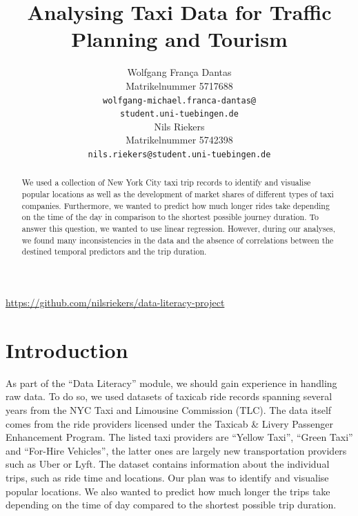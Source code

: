 \documentclass{article}
\title{Analysing Taxi Data for Traffic Planning and Tourism}
\author{%
  Wolfgang França Dantas\\
  Matrikelnummer 5717688\\
  \texttt{wolfgang-michael.franca-dantas@} \\
  \texttt{student.uni-tuebingen.de} \\
  \And
  Nils Riekers\\
  Matrikelnummer 5742398\\
  \texttt{nils.riekers@student.uni-tuebingen.de} \\
}
\begin{document}
\maketitle

\begin{center}
\vspace{-1cm}
\url{https://github.com/nilsriekers/data-literacy-project}
\end{center}

\begin{abstract}
We used a collection of New York City taxi trip records \cite{tlc} to identify and visualise popular locations as well as the development of market shares of different types of taxi companies. Furthermore, we wanted to predict how much longer rides take depending on the time of the day in comparison to the shortest possible journey duration. To answer this question, we wanted to use linear regression. However, during our analyses, we found many inconsistencies in the data and the absence of correlations between the destined temporal predictors and the trip duration.
\end{abstract}

\section{Introduction}
As part of the ``Data Literacy'' module, we should gain experience in handling raw data. To do so, we used datasets of taxicab ride records spanning several years from the NYC Taxi and Limousine Commission (TLC). The data itself comes from the ride providers licensed under the Taxicab \& Livery Passenger Enhancement Program. The listed taxi providers are ``Yellow Taxi'', ``Green Taxi'' and ``For-Hire Vehicles'', the latter ones are largely new transportation providers such as Uber or Lyft. The dataset contains information about the individual trips, such as ride time and locations. Our plan was to identify and visualise popular locations. We also wanted to predict how much longer the trips take depending on the time of day compared to the shortest possible trip duration.
\end{document}
